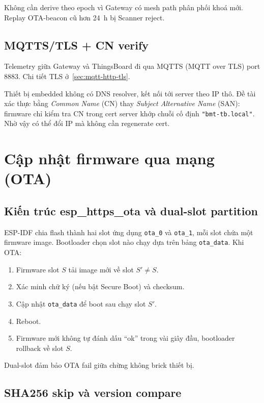 Không cần derive theo epoch vì Gateway có mesh path phân phối khoá mới. Replay OTA-beacon cũ hơn 24~h bị Scanner reject.

\subsection{MQTTS/TLS + CN verify}

Telemetry giữa Gateway và ThingsBoard đi qua MQTTS (MQTT over TLS) port 8883. Chi tiết TLS ở~\ref{sec:mqtt-http-tls}.

Thiết bị embedded không có DNS resolver, kết nối tới server theo IP thô. Đề tài xác thực bằng \textit{Common Name} (CN) thay \textit{Subject Alternative Name} (SAN): firmware chỉ kiểm tra CN trong cert server khớp chuỗi cố định \texttt{"bmt-tb.local"}. Nhờ vậy có thể đổi IP mà không cần regenerate cert.

\section{Cập nhật firmware qua mạng (OTA)}

\subsection{Kiến trúc esp\_https\_ota và dual-slot partition}

ESP-IDF chia flash thành hai slot ứng dụng \texttt{ota\_0} và \texttt{ota\_1}, mỗi slot chứa một firmware image. Bootloader chọn slot nào chạy dựa trên bảng \texttt{ota\_data}. Khi OTA:

\begin{enumerate}
    \item Firmware slot $S$ tải image mới về slot $S' \neq S$.
    \item Xác minh chữ ký (nếu bật Secure Boot) và checksum.
    \item Cập nhật \texttt{ota\_data} để boot sau chạy slot $S'$.
    \item Reboot.
    \item Firmware mới không tự đánh dấu ``ok'' trong vài giây đầu, bootloader rollback về slot $S$.
\end{enumerate}

Dual-slot đảm bảo OTA fail giữa chừng không brick thiết bị.

\subsection{SHA256 skip và version compare}

